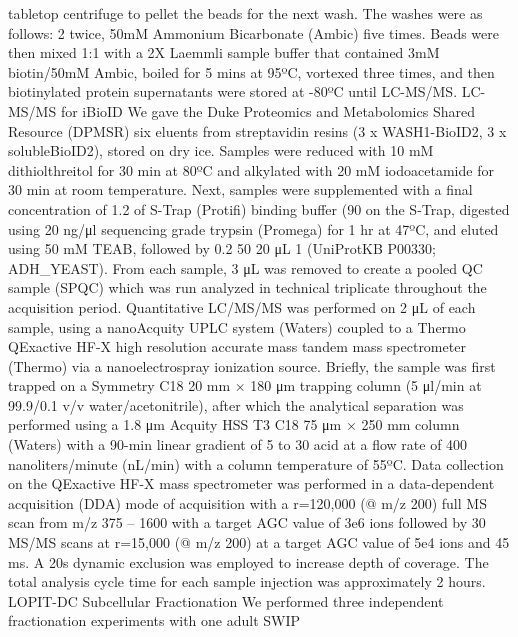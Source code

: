 tabletop centrifuge to pellet the beads for the next wash. The washes were as
follows: 2%
twice, 50mM Ammonium Bicarbonate (Ambic) five times. Beads were then mixed 1:1
with a 2X Laemmli sample buffer that contained 3mM biotin/50mM Ambic, boiled for
5 mins at 95ºC, vortexed three times, and then biotinylated protein supernatants
were stored at -80ºC until LC-MS/MS. 
LC-MS/MS for iBioID
We gave the Duke Proteomics and Metabolomics Shared Resource (DPMSR) six eluents
from streptavidin resins (3 x WASH1-BioID2, 3 x solubleBioID2), stored on dry
ice. Samples were reduced with 10 mM dithiolthreitol for 30 min at 80ºC and
alkylated with 20 mM iodoacetamide for 30 min at room temperature. Next, samples
were supplemented with a final concentration of 1.2%
of S-Trap (Protifi) binding buffer (90%
on the S-Trap, digested using 20 ng/μl sequencing grade trypsin (Promega) for 1
hr at 47ºC, and eluted using 50 mM TEAB, followed by 0.2%
50%
20 μL 1%
(UniProtKB P00330; ADH_YEAST). From each sample, 3 μL was removed to create a
pooled QC sample (SPQC) which was run analyzed in technical triplicate
throughout the acquisition period.
Quantitative LC/MS/MS was performed on 2 μL of each sample, using a nanoAcquity
UPLC system (Waters) coupled to a Thermo QExactive HF-X high resolution accurate
mass tandem mass spectrometer (Thermo) via a nanoelectrospray ionization source.
Briefly, the sample was first trapped on a Symmetry C18 20 mm × 180 μm trapping
column (5 μl/min at 99.9/0.1 v/v water/acetonitrile), after which the analytical
separation was performed using a 1.8 μm Acquity HSS T3 C18 75 μm × 250 mm column
(Waters) with a 90-min linear gradient of 5 to 30%
acid at a flow rate of 400 nanoliters/minute (nL/min) with a column temperature
of 55ºC. Data collection on the QExactive HF-X mass spectrometer was performed
in a data-dependent acquisition (DDA) mode of acquisition with a r=120,000 (@
m/z 200) full MS scan from m/z 375 – 1600 with a target AGC value of 3e6 ions
followed by 30 MS/MS scans at r=15,000 (@ m/z 200) at a target AGC value of 5e4
ions and 45 ms. A 20s dynamic exclusion was employed to increase depth of
coverage. The total analysis cycle time for each sample injection was
approximately 2 hours. 
LOPIT-DC Subcellular Fractionation
We performed three independent fractionation experiments with one adult SWIP
